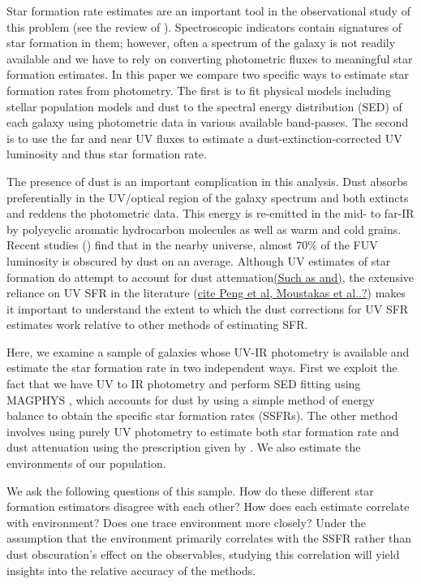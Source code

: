 \documentclass[iop]{emulateapj}
\begin{document}
Star formation rate estimates are an important tool in the observational
study of this problem (see the review of \citealt{kennicutt12a}). 
Spectroscopic indicators contain signatures of star 
formation in them; however, often a spectrum of the galaxy is not 
readily available and we have to rely on converting photometric fluxes 
to meaningful star formation estimates. In this paper we compare 
two specific ways to estimate star formation rates from photometry.
The first is to fit physical models including stellar population
models and dust to the spectral energy distribution 
(SED) of each galaxy using photometric data in various available band-passes.
The second is to use the far and near UV fluxes to estimate a 
dust-extinction-corrected UV luminosity and thus star formation 
rate. 

The presence of dust is an important complication in this analysis.
Dust absorbs preferentially in the UV/optical region of the galaxy 
spectrum and both extincts and reddens the photometric data. This 
energy is re-emitted in the mid- to far-IR by polycyclic aromatic 
hydrocarbon molecules as well as warm and cold grains.
Recent studies (\citet{Burg13}) find that in the nearby universe, 
almost $70\%$ of the FUV luminosity is obscured by dust on an 
average. Although UV estimates of star formation do attempt to 
account for dust attenuation\underline{(Such as \citet{salim_uv_2007} and)}, 
the extensive reliance on UV SFR in the literature 
(\underline{cite Peng et al, Moustakas et al..?}) makes it 
important to understand the extent to which the dust corrections 
for UV SFR estimates work relative to other methods of estimating SFR.

Here, we examine a sample of galaxies whose UV-IR photometry 
is available and estimate the star formation rate in two independent 
ways. First we exploit the fact that we have UV to IR photometry 
and perform SED fitting using MAGPHYS \cite{da_cunha_simple_2008}, which 
accounts for dust by using a simple method of energy balance to 
obtain the specific star formation rates (SSFRs). The other method 
involves using purely UV photometry to estimate both star 
formation rate and dust attenuation using the prescription given 
by \citet{salim_uv_2007}. We also estimate the environments of our population.

We ask the following questions of this sample. How do these 
different star formation estimators disagree with each other? 
How does each estimate correlate with environment? Does
one  trace environment more closely? 
Under the assumption that the environment primarily 
correlates with the SSFR rather than dust obscuration's effect
on the observables, studying this correlation will yield 
insights into the relative accuracy of the methods.
\end{document}
